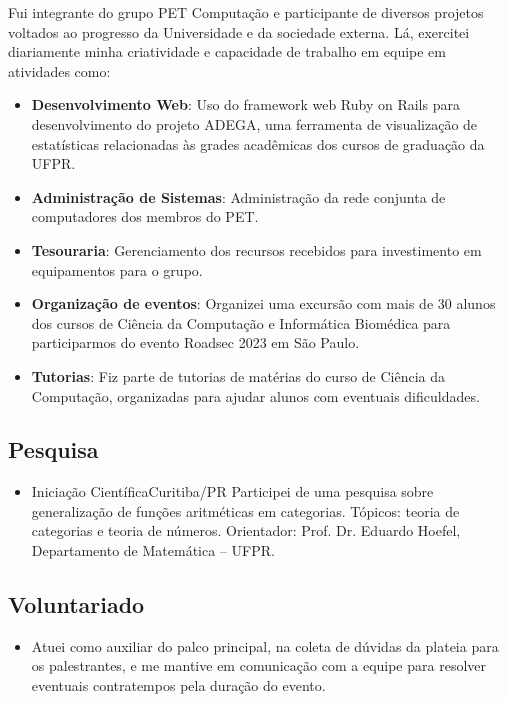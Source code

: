 \documentclass[a4paper, 12pt]{moderncv}
\begin{document}
\vspace{3pt}
Fui integrante do grupo PET Computação e participante de diversos projetos
voltados ao progresso da Universidade e da sociedade externa. Lá, exercitei
diariamente minha criatividade e capacidade de trabalho em equipe em
atividades como:
\vspace{4pt}
\begin{itemize}
    \item{\textbf{Desenvolvimento Web}: Uso do framework web Ruby on Rails para
          desenvolvimento do projeto ADEGA, uma ferramenta de visualização de
          estatísticas relacionadas às grades acadêmicas dos cursos de graduação da
          UFPR.}
    \item{\textbf{Administração de Sistemas}: Administração da rede
          conjunta de computadores dos membros do PET.}
    \item{\textbf{Tesouraria}: Gerenciamento dos recursos recebidos para investimento
          em equipamentos para o grupo.}
    \item{\textbf{Organização de eventos}: Organizei uma excursão com mais de
          30 alunos dos cursos de Ciência da Computação e Informática Biomédica
          para participarmos do evento Roadsec 2023 em São Paulo.}
    \item{\textbf{Tutorias}: Fiz parte de tutorias de matérias do curso de Ciência
          da Computação, organizadas para ajudar alunos com eventuais dificuldades.}
\end{itemize}

\vspace{4pt}
\subsection{\small{Pesquisa}}
\begin{itemize}
    \item{
        {Iniciação Científica}{Curitiba/PR}{}
        {Participei de uma pesquisa sobre generalização de funções aritméticas em
         categorias. Tópicos: teoria de categorias e teoria de números. Orientador:
         Prof. Dr. Eduardo Hoefel, Departamento de Matemática -- UFPR.}}
\end{itemize}

\vspace{4pt}
\subsection{\small{Voluntariado}}
\begin{itemize}
    \item{
            {\vspace{3pt}Atuei como auxiliar do palco principal, na coleta de dúvidas
                da plateia para os palestrantes, e me mantive em comunicação com a equipe
            para resolver eventuais contratempos pela duração do evento.}}
        \vspace{4pt}
\end{itemize}
\vspace{4pt}
\end{document}
